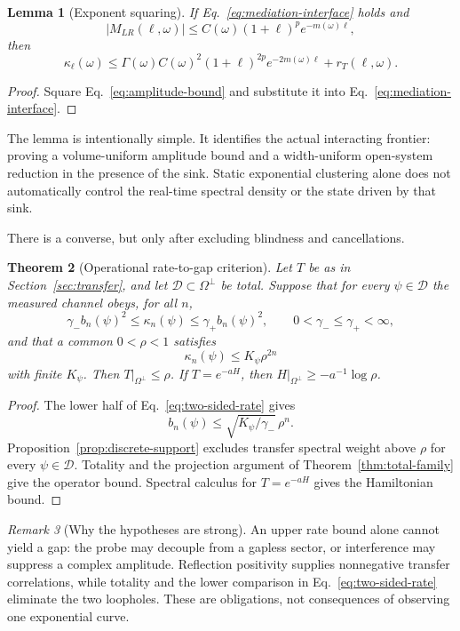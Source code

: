 \documentclass[11pt,a4paper]{article}
\newtheorem{theorem}{Theorem}[section]
\newtheorem{lemma}[theorem]{Lemma}
\theoremstyle{definition}
\theoremstyle{remark}
\newtheorem{remark}[theorem]{Remark}
\begin{document}
\begin{lemma}[Exponent squaring]
\label{lem:exponent-squaring}
If Eq.~\eqref{eq:mediation-interface} holds and
\[
  |M_{LR}(\ell,\omega)|
  \leq C(\omega)(1+\ell)^p e^{-m(\omega)\ell},
  \label{eq:amplitude-bound}
\]
then
\[
  \kappa_\ell(\omega)
  \leq\Gamma(\omega)C(\omega)^2(1+\ell)^{2p}
  e^{-2m(\omega)\ell}+r_T(\ell,\omega).
  \label{eq:rate-bound}
\]
\end{lemma}

\begin{proof}
Square Eq.~\eqref{eq:amplitude-bound} and substitute it into
Eq.~\eqref{eq:mediation-interface}.
\end{proof}

The lemma is intentionally simple.  It identifies the actual interacting
frontier: proving a volume-uniform amplitude bound and a width-uniform
open-system reduction in the presence of the sink.  Static exponential
clustering alone does not automatically control the real-time spectral density
or the state driven by that sink.

There is a converse, but only after excluding blindness and cancellations.

\begin{theorem}[Operational rate-to-gap criterion]
\label{thm:rate-to-gap}
Let $T$ be as in Section~\ref{sec:transfer}, and let
$\mathcal D\subset\Omega^\perp$ be total.  Suppose that for every
$\psi\in\mathcal D$ the measured channel obeys, for all $n$,
\[
  \gamma_- b_n(\psi)^2\leq\kappa_n(\psi)
  \leq\gamma_+ b_n(\psi)^2,
  \qquad 0<\gamma_-\leq\gamma_+<\infty,
  \label{eq:two-sided-rate}
\]
and that a common $0<\rho<1$ satisfies
\[
  \kappa_n(\psi)\leq K_\psi\rho^{2n}
\]
with finite $K_\psi$.  Then $T|_{\Omega^\perp}\leq\rho$.  If
$T=e^{-aH}$, then $H|_{\Omega^\perp}\geq-a^{-1}\log\rho$.
\end{theorem}

\begin{proof}
The lower half of Eq.~\eqref{eq:two-sided-rate} gives
\[
  b_n(\psi)\leq\sqrt{K_\psi/\gamma_-}\,\rho^n.
\]
Proposition~\ref{prop:discrete-support} excludes transfer spectral weight above
$\rho$ for every $\psi\in\mathcal D$.  Totality and the projection argument of
Theorem~\ref{thm:total-family} give the operator bound.  Spectral calculus for
$T=e^{-aH}$ gives the Hamiltonian bound.
\end{proof}

\begin{remark}[Why the hypotheses are strong]
An upper rate bound alone cannot yield a gap: the probe may decouple from a
gapless sector, or interference may suppress a complex amplitude.  Reflection
positivity supplies nonnegative transfer correlations, while totality and the
lower comparison in Eq.~\eqref{eq:two-sided-rate} eliminate the two loopholes.
These are obligations, not consequences of observing one exponential curve.
\end{remark}
\end{document}
